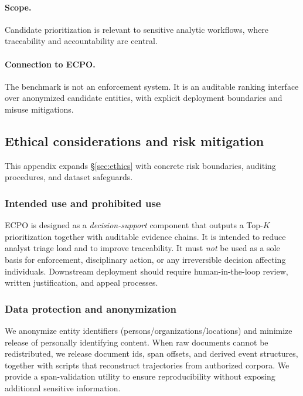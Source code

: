 \documentclass{article}
\begin{document}
\paragraph{Scope.}
Candidate prioritization is relevant to sensitive analytic workflows, where traceability and accountability are central.
\paragraph{Connection to ECPO.}
The benchmark is not an enforcement system. It is an auditable ranking interface over anonymized candidate entities, with explicit deployment boundaries and misuse mitigations.

\subsection{Ethical considerations and risk mitigation}
\label{sec:app_ethics}

This appendix expands \S\ref{sec:ethics} with concrete risk boundaries, auditing procedures, and dataset safeguards.

\subsubsection{Intended use and prohibited use}

ECPO is designed as a \emph{decision-support} component that outputs a Top-$K$ prioritization together with auditable evidence chains.
It is intended to reduce analyst triage load and to improve traceability.
It must \emph{not} be used as a sole basis for enforcement, disciplinary action, or any irreversible decision affecting individuals.
Downstream deployment should require human-in-the-loop review, written justification, and appeal processes.

\subsubsection{Data protection and anonymization}

We anonymize entity identifiers (persons/organizations/locations) and minimize release of personally identifying content.
When raw documents cannot be redistributed, we release document ids, span offsets, and derived event structures, together with scripts that reconstruct trajectories from authorized corpora.
We provide a span-validation utility to ensure reproducibility without exposing additional sensitive information.
\end{document}
